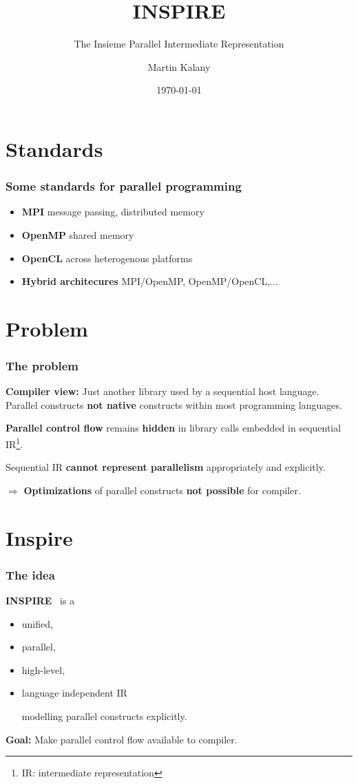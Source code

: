 \documentclass{beamer}
\title{INSPIRE}
\subtitle{The Insieme Parallel Intermediate Representation}
\author{Martin Kalany}
\institute
{
  Graduate student in Computer Science\\
  Vienna University of Technology\\
}
\date{\today}
\newcommand\fR[1]{\textcolor{red!80!black}{\textbf{#1}}}
\newcommand\fB[1]{\textcolor{blue!80!black}{\textbf{#1}}}
\newcommand\fG[1]{\textcolor{green!70!black}{\textbf{#1}}}
\begin{document}
\maketitle

\section{Standards}
\begin{frame}
\frametitle{Some standards for parallel programming}
\begin{itemize}
\item \fB{MPI} message passing, distributed memory
\item \fB{OpenMP} shared memory
\item \fB{OpenCL} across heterogenous platforms

\bigskip
\item \fB{Hybrid architecures} MPI/OpenMP, OpenMP/OpenCL,...
\end{itemize}
\end{frame}

\section{Problem}
\begin{frame}
\frametitle{The problem}

\fB{Compiler view:} Just another library used by a sequential host language. Parallel constructs \fR{not native} constructs within most programming languages.

\bigskip\pause
\fR{Parallel control flow} remains \fR{hidden} in library calls embedded in sequential IR\footnote{IR: intermediate representation}.

\bigskip\pause
Sequential IR \fR{cannot represent parallelism} appropriately and explicitly.

\bigskip\pause
$\Rightarrow$ \fR{Optimizations} of parallel constructs \fR{not possible} for compiler. 
\end{frame}

\section{Inspire}
\begin{frame}
\frametitle{The idea}
\fB{INSPIRE}~\cite{JordanPTKF13}  is a
\begin{itemize}
\item unified,
\item parallel,
\item high-level,
\item language independent IR

\smallskip
modelling parallel constructs explicitly.
\end{itemize}
\bigskip\pause
\fG{Goal:} Make parallel control flow available to compiler.
\end{frame}
\end{document}
